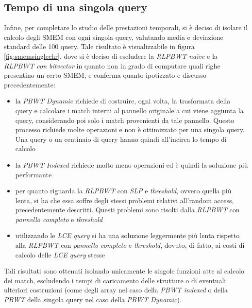 \subsection{Tempo di una singola query}
Infine, per completare lo studio delle prestazioni temporali, si è deciso di
isolare il calcolo degli SMEM con ogni singola query, valutando media e
deviazione standard delle 100 query. Tale risultato è visualizzabile in figura
\ref{fig:smemsinglechr}, dove si è deciso di escludere la \textit{RLPBWT
  na\"{i}ve} e la \textit{RLPBWT con bitvector} in quanto non in grado di
computare quali righe presentino un certo SMEM, e conferma quanto ipotizzato e
discusso precedentemente: 
\begin{itemize}
  \item la \textit{PBWT Dynamic} richiede di costruire, ogni volta, la
  trasformata della query e
  calcolare i match interni al pannello originale a cui viene
  aggiunta la query, considerando poi solo i match provenienti da tale
  pannello. Questo processo richiede molte operazioni e non è ottimizzato per 
  una singola query. Una query o un centinaio di query hanno quindi all'incirca
  lo tempo di calcolo
  \item la \textit{PBWT Indexed} richiede molto meno operazioni ed è quindi la
  soluzione più performante
  \item per quanto riguarda la \textit{RLPBWT} con \textit{SLP} e
  \textit{threshold}, ovvero quella più lenta, si ha che essa soffre
  degli stessi problemi relativi all'random access, precedentemente
  descritti. Questi problemi sono risolti dalla \textit{RLPBWT} con
  \textit{pannello completo} e \textit{threshold}
  \item  utilizzando le \textit{LCE query} si ha una soluzione leggermente più
  lenta rispetto alla \textit{RLPBWT} con
  \textit{pannello completo} e \textit{threshold}, dovuto, di fatto, ai costi
  di calcolo delle \textit{LCE query} stesse
\end{itemize}
Tali risultati sono ottenuti isolando unicamente le singole funzioni atte al
calcolo dei match, escludendo i tempi di caricamento delle strutture o di
eventuali ulteriori costruzioni (come degli array nel caso della \textit{PBWT
  indexed} o della \textit{PBWT} della singola query nel caso della \textit{PBWT
Dynamic}).

